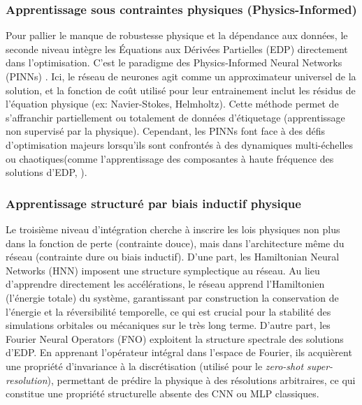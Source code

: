 \subsubsection{Apprentissage sous contraintes physiques (Physics-Informed)}
Pour pallier le manque de robustesse physique et la dépendance aux données, le seconde niveau intègre les Équations aux Dérivées Partielles (EDP) directement dans l'optimisation. C'est le paradigme des Physics-Informed Neural Networks (PINNs) \cite{raissi_physics-informed_2019}. Ici, le réseau de neurones agit comme un approximateur universel de la solution, et la fonction de coût utilisé pour leur entrainement inclut les résidus de l'équation physique (ex: Navier-Stokes, Helmholtz). Cette méthode permet de s'affranchir partiellement ou totalement de données d'étiquetage (apprentissage non supervisé par la physique). Cependant, les PINNs font face à des défis d'optimisation majeurs lorsqu'ils sont confrontés à des dynamiques multi-échelles ou chaotiques(comme l'apprentissage des composantes à haute fréquence des solutions d'EDP, \cite{wang_eigenvector_2021}).

\subsubsection{Apprentissage structuré par biais inductif physique}
Le troisième niveau d'intégration cherche à inscrire les lois physiques non plus dans la fonction de perte (contrainte douce), mais dans l'architecture même du réseau (contrainte dure ou biais inductif). D'une part, les Hamiltonian Neural Networks (HNN)  \cite{greydanus_hamiltonian_2019} imposent une structure symplectique au réseau. Au lieu d'apprendre directement les accélérations, le réseau apprend l'Hamiltonien (l'énergie totale) du système, garantissant par construction la conservation de l'énergie et la réversibilité temporelle, ce qui est crucial pour la stabilité des simulations orbitales ou mécaniques sur le très long terme. D'autre part, les Fourier Neural Operators (FNO) \cite{li_fourier_2021} exploitent la structure spectrale des solutions d'EDP. En apprenant l'opérateur intégral dans l'espace de Fourier, ils acquièrent une propriété d'invariance à la discrétisation (utilisé pour  le \textit{zero-shot super-resolution}), permettant de prédire la physique à des résolutions arbitraires, ce qui constitue une propriété structurelle absente des CNN ou MLP classiques.

